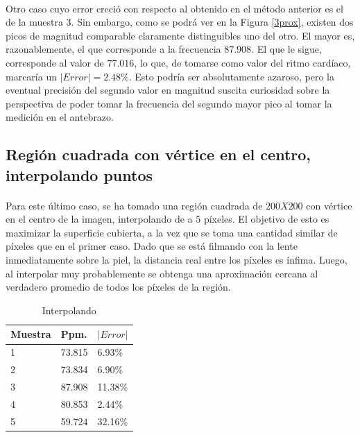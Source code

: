 \documentclass[12pt, twocolumn]{article}
\begin{document}
	\paragraph{} Otro caso cuyo error creció con respecto al obtenido en el método anterior es el de la muestra 3. Sin embargo, como se podrá ver en la Figura \ref{3prox}, existen dos picos de magnitud comparable claramente distinguibles uno del otro. El mayor es, razonablemente, el que corresponde a la frecuencia $87.908$. El que le sigue, corresponde al valor de $77.016$, lo que, de tomarse como valor del ritmo cardíaco, marcaría un $|Error| = 2.48\%$. Esto podría ser absolutamente azaroso, pero la eventual precisión del segundo valor en magnitud suscita curiosidad sobre la perspectiva de poder tomar la frecuencia del segundo mayor pico al tomar la medición en el antebrazo.
	
	\subsection{Región cuadrada con vértice en el centro, interpolando puntos}
	
	\paragraph{} Para este último caso, se ha tomado una región cuadrada de $200X200$ con vértice en el centro de la imagen, interpolando de a $5$ píxeles. El objetivo de esto es maximizar la superficie cubierta, a la vez que se toma una cantidad similar de píxeles que en el primer caso. Dado que se está filmando con la lente inmediatamente sobre la piel, la distancia real entre los píxeles es ínfima. Luego, al interpolar muy probablemente se obtenga una aproximación cercana al verdadero promedio de todos los píxeles de la región.
	
	\begin{table}[H]
		\centering
		\begin{tabular}{@{}lll@{}}
			\toprule
			Muestra & Ppm.   &  $|Error|$   \\ \midrule
			1       & 73.815 & 6.93\%  \\
			2       & 73.834 & 6.90\%  \\
			3       & 87.908 & 11.38\% \\
			4       & 80.853 & 2.44\%  \\
			5       & 59.724 & 32.16\% \\ \bottomrule
		\end{tabular}
		\caption{Interpolando}
		\label{inter}
	\end{table}
	
\end{document}
